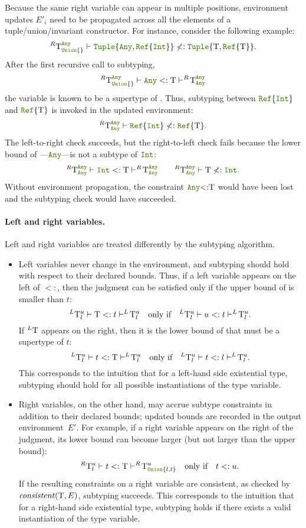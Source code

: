 Because the same right variable can appear in multiple positions, environment
updates $E'_i$ need to be propagated across all the elements of
a tuple/union/invariant constructor.
For instance, consider the following example:
\[ 
  ^R \T_{\uniontyp{}}^{\anytyp} \vdash 
  \tupletyp{\anytyp, \reftyp{\inttyp}} \nless: \tupletyp{\T, \reftyp{\T}}.
\]
After the first recursive call to subtyping,
\[ 
  ^R \T_{\uniontyp{}}^{\anytyp} \vdash \anytyp <: \T 
  \vdash ^R\!\T_{\anytyp}^{\anytyp}
\]
the variable \T is known to be a supertype of \anytyp.
Thus, subtyping between $\reftyp{\inttyp}$ and $\reftyp{\T}$ is invoked
in the updated environment:
\[ 
  ^R \T_{\anytyp}^{\anytyp} \vdash 
  \reftyp{\inttyp} \nless: \reftyp{\T}.
\]
The left-to-right check succeeds, but the right-to-left check fails because
the lower bound of \T---$\anytyp$---is not a subtype of $\inttyp$:
\[ 
  ^R \T_{\anytyp}^{\anytyp} \vdash \inttyp <: \T \vdash ^R\!\T_{\anytyp}^{\anytyp}
  \qquad 
  ^R \T_{\anytyp}^{\anytyp} \vdash \T \nless: \inttyp.
\]
Without environment propagation, the constraint $\anytyp{<:}\T$ would have been
lost and the subtyping check would have succeeded.

\paragraph{Left and right variables.}
Left and right variables are treated differently by the subtyping algorithm.
\begin{itemize}
  \item Left variables never change in the environment, and subtyping should
  hold with respect to their declared bounds.
  Thus, if a left variable \T appears on the
  left of $<:$, then the judgment can be satisfied
  only if the upper bound of \T is smaller than $t$:
  \[ ^L \T_l^u \vdash \T <: t \vdash ^L\! \T_l^u\ \ \text{ only if }\ \ 
     ^L \T_l^u \vdash u <: t \vdash ^L\!\T_l^u. \]
  If $^L \mathrm{T}$ appears on the right, then
  it is the lower bound of \T that must be a supertype of $t$:
  \[ ^L \T_l^u \vdash t <: \T \vdash ^L\! \T_l^u \ \ \text{ only if }\ \ 
     ^L \T_l^u \vdash t <: l \vdash ^L\!\T_l^u. \]
  This corresponds to the intuition that for a left-hand side existential type,
  subtyping should hold for all possible instantiations of the type variable.
  \item Right variables, on the other hand, may accrue subtype constraints
  in addition to their declared bounds;
  updated bounds are recorded in the output environment~$E'$.
  For example, if a right variable \T appears on the right of the judgment,
  its lower bound can become larger (but not larger than the upper bound):
  \[ ^R \T_l^u \vdash \t <: \T \vdash ^R\!\T_{\uniontyp{l, t}}^u \ \ 
    \text{ only if }\ \ \t <:u. \]
  If the resulting constraints on a right variable are consistent,
  as checked by $\mathit{consistent}(\mathrm{T}, E)$, subtyping succeeds.
  This corresponds to the intuition that
  for a right-hand side existential type, subtyping holds
  if there exists a valid instantiation of the type variable.  
\end{itemize}

